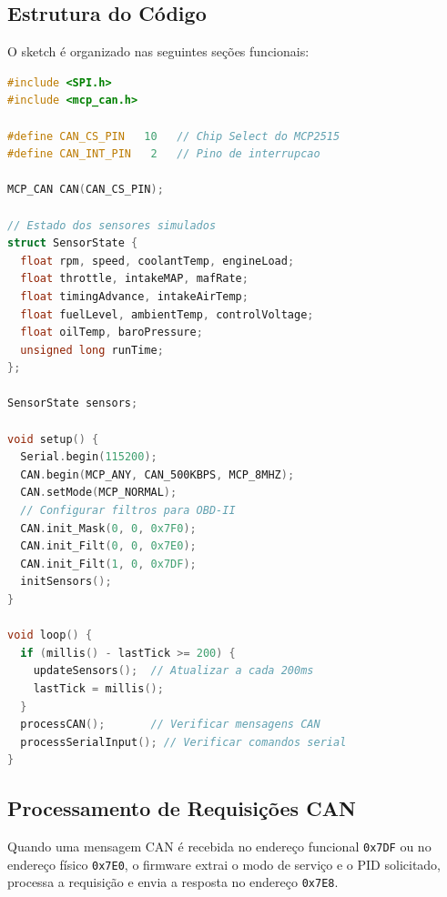 \subsection{Estrutura do Código}

O sketch é organizado nas seguintes seções funcionais:

\begin{lstlisting}[language=C++, caption={Estrutura principal do firmware Arduino.}, label={lst:arduino-structure}]
#include <SPI.h>
#include <mcp_can.h>

#define CAN_CS_PIN   10   // Chip Select do MCP2515
#define CAN_INT_PIN   2   // Pino de interrupcao

MCP_CAN CAN(CAN_CS_PIN);

// Estado dos sensores simulados
struct SensorState {
  float rpm, speed, coolantTemp, engineLoad;
  float throttle, intakeMAP, mafRate;
  float timingAdvance, intakeAirTemp;
  float fuelLevel, ambientTemp, controlVoltage;
  float oilTemp, baroPressure;
  unsigned long runTime;
};

SensorState sensors;

void setup() {
  Serial.begin(115200);
  CAN.begin(MCP_ANY, CAN_500KBPS, MCP_8MHZ);
  CAN.setMode(MCP_NORMAL);
  // Configurar filtros para OBD-II
  CAN.init_Mask(0, 0, 0x7F0);
  CAN.init_Filt(0, 0, 0x7E0);
  CAN.init_Filt(1, 0, 0x7DF);
  initSensors();
}

void loop() {
  if (millis() - lastTick >= 200) {
    updateSensors();  // Atualizar a cada 200ms
    lastTick = millis();
  }
  processCAN();       // Verificar mensagens CAN
  processSerialInput(); // Verificar comandos serial
}
\end{lstlisting}

\subsection{Processamento de Requisições CAN}

Quando uma mensagem CAN é recebida no endereço funcional \texttt{0x7DF} ou no endereço físico \texttt{0x7E0}, o firmware extrai o modo de serviço e o PID solicitado, processa a requisição e envia a resposta no endereço \texttt{0x7E8}.

